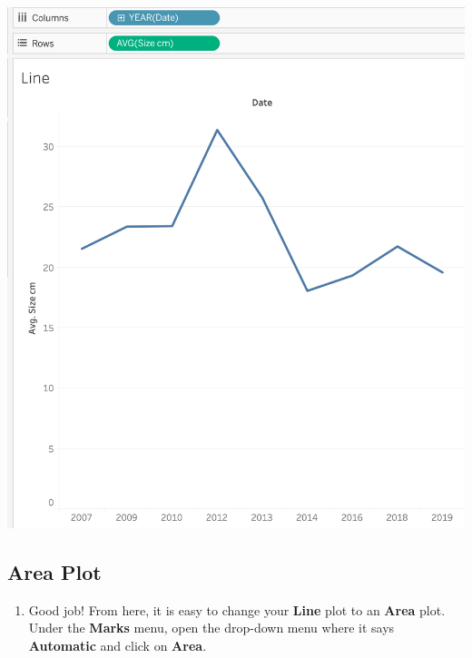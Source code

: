 \documentclass[
]{book}
\providecommand{\tightlist}{%
  \setlength{\itemsep}{0pt}\setlength{\parskip}{0pt}}
\begin{document}
\includegraphics{images/M3S2_Line-Plot.png}

\hypertarget{area-plot}{%
\subsection{Area Plot}\label{area-plot}}

\begin{enumerate}
\def\labelenumi{\arabic{enumi}.}
\tightlist
\item
  Good job! From here, it is easy to change your \textbf{Line} plot to an \textbf{Area} plot. Under the \textbf{Marks} menu, open the drop-down menu where it says \textbf{Automatic} and click on \textbf{Area}.
\end{enumerate}
\end{document}
